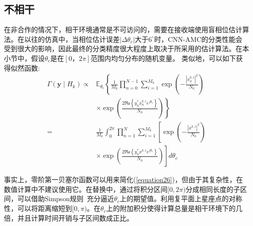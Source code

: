 \documentclass[final]{cvpr}
\begin{document}
\subsection{不相干}\label{incoherent}

在非合作的情况下，相干环境通常是不可访问的，需要在接收端使用盲相位估计算法。在以往的仿真中，当相位估计误差$|\Delta \theta_c|$大于$6^{\circ}$时，CNN-AMC的分类性能会受到很大的影响，因此最终的分类精度很大程度上取决于所采用的估计算法。在本小节中，假设$\theta_c$是在$[0，2\pi]$范围内均匀分布的随机变量。
类似地，可以如下获得似然函数:
\begin{equation}
\begin{aligned}
\Gamma\left(\mathbf{y} \mid H_{k}\right) \propto & \mathbb{E}_{\theta_{c}}\left\{\frac{1}{M_{k}} \prod_{n=0}^{N-1} \sum_{i=1}^{M_{k}} \exp \left(-\frac{\left|x_{n}^{k, i}\right|^{2}}{N_{0}}\right)\right.\\
&\left.\times \exp \left(\frac{2 \Re \mathfrak{e}\left\{y_{n}^{*} x_{n}^{k, i} e^{j \theta_{c}}\right\}}{N_{0}}\right)\right\} \\
=& \frac{1}{M_{k}} \int_{0}^{2 \pi} \prod_{n=1}^{N} \sum_{i=1}^{M_{k}}\left[\exp \left(-\frac{\left|x^{k, i}\right|^{2}}{N_{0}}\right)\right.\\
&\left.\times \exp \left(\frac{2 \Re \mathfrak{e}\left\{y_{n}^{*} x^{k, i} e^{j \theta_{c}}\right\}}{N_{0}}\right)\right] d \theta_{c}
\end{aligned}\label{equation26}
\end{equation}

事实上，零阶第一贝塞尔函数可以用来简化(\ref{equation26})，但由于其复杂性，在数值计算中不建议使用它。在替换中，通过将积分区间$[0,2\pi)$分成相同长度的子区间，可以借助Simpson规则~\cite{r20}充分逼近$\theta_c$上的期望值。利用复平面上星座点的对称性，可以将距离缩短到$[0,\pi)$。在$\theta_c$上的附加积分使得计算总量是相干环境下的几倍，并且计算时间开销与子区间数成正比。
\end{document}
